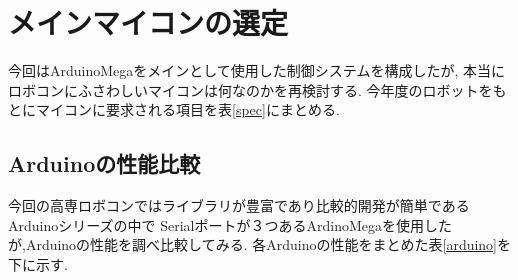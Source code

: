 \documentclass[twocolumn,11pt]{abst}
\begin{document}
\section{メインマイコンの選定}
今回はArduinoMegaをメインとして使用した制御システムを構成したが,
本当にロボコンにふさわしいマイコンは何なのかを再検討する.
今年度のロボットをもとにマイコンに要求される項目を表\ref{spec}にまとめる.
\begin{table}[htb]
 \begin{center}
  \caption{要求スペック}
    \label{spec}
 \end{center}
\end{table}

\subsection{Arduinoの性能比較}
今回の高専ロボコンではライブラリが豊富であり比較的開発が簡単であるArduinoシリーズの中で
Serialポートが３つあるArdinoMegaを使用したが,Arduinoの性能を調べ比較してみる.
各Arduinoの性能をまとめた表\ref{arduino}を下に示す.
\end{document}
